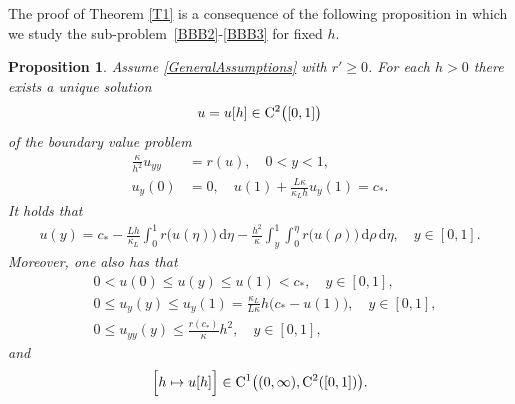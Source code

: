 \documentclass[reqno,11pt]{amsart}
\newtheorem{prop}[thm]{Proposition}
\numberwithin{equation}{section}
\newcommand{\rd}{\mathrm{d}}
\begin{document}
The proof of Theorem \ref{T1} is a consequence of the following
proposition in which we study the
sub-problem~\eqref{BBB2}-\eqref{BBB3} for fixed $h$.

\begin{prop}\label{P1}
Assume \eqref{GeneralAssumptions} with $r'\ge 0$. For each $h>0$ there exists a
unique solution $$u=u[h]\in {\rm C}^2 \bigl( [0,1]\bigr)$$ of the
boundary value problem
\begin{subequations}\label{BBBB}
\begin{align}
\frac{\kappa}{h^2} u_{yy}&= r(u),\quad  0<y<1,\label{BBBB1}\\
u_y(0)&=0,\quad u(1)+\frac{L\kappa}{\kappa_L h}u_y(1)=c_*.\label{BBBB2}
\end{align}
\end{subequations}
It holds that
\begin{align}\label{C}
  u(y)=c_*-\frac{Lh}{\kappa_L}\int_0^1
  r \bigl( u(\eta)\bigr)\,\rd \eta-\frac{h^2}{\kappa}
  \int_y^1\int_0^\eta r \bigl( u(\rho)\bigr)\,\rd\rho \,\rd \eta,\quad y\in [0,1].
\end{align}
Moreover, one also has that
\begin{subequations}\label{ccc}
\begin{align}
&0< u(0)\le u(y)\le u(1)< c_*,\quad  y\in [0,1],\label{ccc1}\\
&0\le u_y(y)\le u_y(1)=\frac{\kappa_L}{L\kappa}h \big(c_*-u(1)\big),\quad 
y\in [0,1],\label{ccc2}\\
&0\le u_{yy}(y)\le \frac{r(c_*)}{\kappa}h^2,\quad  y\in [0,1], \label{ccc3}
\end{align}
\end{subequations}
and
$$
\Bigl[ h\mapsto u[h]\Bigr]\in {\rm C}^1\big((0,\infty),
{\rm C}^2([0,1])\big).
$$
\end{prop}
\end{document}
